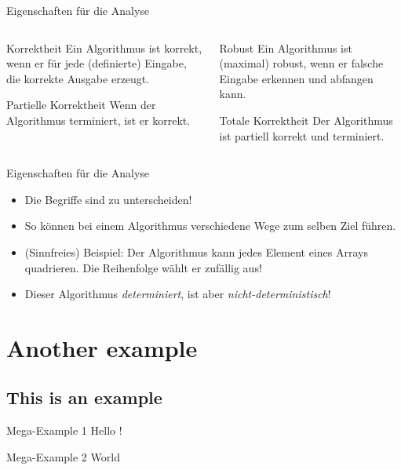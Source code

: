 \documentclass[aspectratio=169,usepdftitle=true]{beamer}
\newcommand\twosplit[3][t]{%
\begin{columns}[#1]
\begin{column}{0.475\linewidth}#2\end{column}\hfill
\begin{column}{0.475\linewidth}#3\end{column}
\end{columns}}
\begin{document}
\begin{frame}[c]{Eigenschaften für die Analyse}
    \twosplit{%
    \begin{block}{Korrektheit}
        Ein Algorithmus ist korrekt, wenn er für jede (definierte) Eingabe, die korrekte Ausgabe erzeugt.
    \end{block}
    \begin{block}{Partielle Korrektheit}
        Wenn der Algorithmus terminiert, ist er korrekt.
    \end{block}
    }{%
    \begin{block}{Robust}
        Ein Algorithmus ist (maximal) robust, wenn er falsche Eingabe erkennen und abfangen kann.
    \end{block}
    \begin{block}{Totale Korrektheit}
        Der Algorithmus ist partiell korrekt und terminiert.
    \end{block}
    }
\end{frame}

\begin{frame}{Eigenschaften für die Analyse}
    \begin{itemize}
        \item Die Begriffe sind zu unterscheiden!
        \item So können bei einem Algorithmus verschiedene Wege zum selben Ziel führen.
        \item (Sinnfreies) Beispiel: Der Algorithmus kann jedes Element eines Arrays quadrieren. Die Reihenfolge wählt er zufällig aus!
        \item Dieser Algorithmus \emph{determiniert}, ist aber \emph{nicht-deterministisch}!
    \end{itemize}
\end{frame}


\section{Another example}
\subsection{This is an example}

\begin{frame}{Mega-Example 1}
    Hello \cite{knuth-fa}!
\end{frame}

\begin{frame}{Mega-Example 2}
    World
\end{frame}
\end{document}
